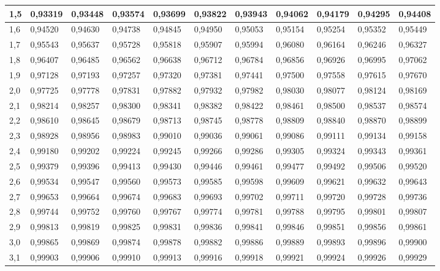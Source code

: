 \documentclass[12pt,a4paper,twocolumn]{article}
\begin{document}
\begin{tabular}{l|l|l|l|l|l|l|l|l|l|l}
1,5 & 0,93319 & 0,93448 & 0,93574 & 0,93699 & 0,93822 & 0,93943 & 0,94062 & 0,94179 & 0,94295 & 0,94408\\ \hline
1,6 & 0,94520 & 0,94630 & 0,94738 & 0,94845 & 0,94950 & 0,95053 & 0,95154 & 0,95254 & 0,95352 & 0,95449\\ \hline
1,7 & 0,95543 & 0,95637 & 0,95728 & 0,95818 & 0,95907 & 0,95994 & 0,96080 & 0,96164 & 0,96246 & 0,96327\\ \hline
1,8 & 0,96407 & 0,96485 & 0,96562 & 0,96638 & 0,96712 & 0,96784 & 0,96856 & 0,96926 & 0,96995 & 0,97062\\ \hline
1,9 & 0,97128 & 0,97193 & 0,97257 & 0,97320 & 0,97381 & 0,97441 & 0,97500 & 0,97558 & 0,97615 & 0,97670\\ \hline
2,0 & 0,97725 & 0,97778 & 0,97831 & 0,97882 & 0,97932 & 0,97982 & 0,98030 & 0,98077 & 0,98124 & 0,98169\\ \hline
2,1 & 0,98214 & 0,98257 & 0,98300 & 0,98341 & 0,98382 & 0,98422 & 0,98461 & 0,98500 & 0,98537 & 0,98574\\ \hline
2,2 & 0,98610 & 0,98645 & 0,98679 & 0,98713 & 0,98745 & 0,98778 & 0,98809 & 0,98840 & 0,98870 & 0,98899\\ \hline
2,3 & 0,98928 & 0,98956 & 0,98983 & 0,99010 & 0,99036 & 0,99061 & 0,99086 & 0,99111 & 0,99134 & 0,99158\\ \hline
2,4 & 0,99180 & 0,99202 & 0,99224 & 0,99245 & 0,99266 & 0,99286 & 0,99305 & 0,99324 & 0,99343 & 0,99361\\ \hline
2,5 & 0,99379 & 0,99396 & 0,99413 & 0,99430 & 0,99446 & 0,99461 & 0,99477 & 0,99492 & 0,99506 & 0,99520\\ \hline
2,6 & 0,99534 & 0,99547 & 0,99560 & 0,99573 & 0,99585 & 0,99598 & 0,99609 & 0,99621 & 0,99632 & 0,99643\\ \hline
2,7 & 0,99653 & 0,99664 & 0,99674 & 0,99683 & 0,99693 & 0,99702 & 0,99711 & 0,99720 & 0,99728 & 0,99736\\ \hline
2,8 & 0,99744 & 0,99752 & 0,99760 & 0,99767 & 0,99774 & 0,99781 & 0,99788 & 0,99795 & 0,99801 & 0,99807\\ \hline
2,9 & 0,99813 & 0,99819 & 0,99825 & 0,99831 & 0,99836 & 0,99841 & 0,99846 & 0,99851 & 0,99856 & 0,99861\\ \hline
3,0 & 0,99865 & 0,99869 & 0,99874 & 0,99878 & 0,99882 & 0,99886 & 0,99889 & 0,99893 & 0,99896 & 0,99900\\ \hline
3,1 & 0,99903 & 0,99906 & 0,99910 & 0,99913 & 0,99916 & 0,99918 & 0,99921 & 0,99924 & 0,99926 & 0,99929\\ \hline

\end{tabular}
\end{document}

